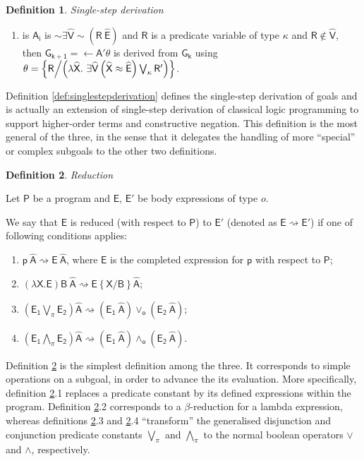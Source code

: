 \documentclass[inscr,ack,preface]{dithesis}
\theoremstyle{definition}
\newtheorem{definition}{Definition}[]
\newcommand{\msf}[1]{$\mathsf{#1}$}
\begin{document}
\begin{definition}{\emph{Single-step derivation}}
\begin{enumerate}
        where \msf{R'} is a fresh predicate variable of type \msf{\kappa};
  \item is \msf{A_i} is \msf{\sim \exists \widehat{V} \sim \left( R ~ \widehat{E} \right)}
        and \msf{R} is a predicate variable of type \msf{\kappa}
        and \msf{R \not\in \widehat{V}}, \\
        then \msf{G_{k+1} = \leftarrow A' \theta} is derived from \msf{G_k}
        using \msf{\theta = \left\{ R \middle/ \left( \lambda \widehat{X} . ~ \exists \widehat{V} \left( \widehat{X} \approx \widehat{E} \right) \bigvee_{\kappa} R' \right) \right\}}.
\end{enumerate}

Definition \ref{def:singlestepderivation} defines the single-step derivation of goals and is actually an extension of single-step derivation of classical logic programming to support higher-order terms and constructive negation. This definition is the most general of the three, in the sense that it delegates the handling of more ``special'' or complex subgoals to the other two definitions.
\end{definition}

\begin{definition}{\emph{Reduction}}
\label{def:reduction}

Let \msf{P} be a program and \msf{E}, \msf{E'} be body expressions of type $o$.

We say that \msf{E} is reduced (with respect to \msf{P}) to \msf{E'} (denoted as \msf{E \rightsquigarrow E'}) if one of following conditions applies:

\begin{enumerate}
  \item \msf{p ~ \widehat{A} \rightsquigarrow E ~ \widehat{A}}, where \msf{E} is the completed expression for \msf{p} with respect to \msf{P};
  \item \msf{\left( \lambda X. E \right) B ~ \widehat{A} \rightsquigarrow E\left\{ X / B \right\} \widehat{A}};
  \item \msf{\left( E_1 \bigvee_{\pi} E_2 \right) \widehat{A} \rightsquigarrow \left( E_1 ~ \widehat{A} \right) \lor_{o} \left( E_2 ~ \widehat{A}  \right)};
  \item \msf{\left( E_1 \bigwedge_{\pi} E_2 \right) \widehat{A} \rightsquigarrow \left( E_1 ~ \widehat{A} \right) \land_{o} \left( E_2 ~ \widehat{A}  \right)}.
\end{enumerate}

Definition \ref{def:reduction} is the simplest definition among the three. It corresponds to simple operations on a subgoal, in order to advance the its evaluation. More specifically, definition \ref{def:reduction}.1 replaces a predicate constant by its defined expressions within the program. Definition \ref{def:reduction}.2 corresponds to a $\beta$-reduction for a lambda expression, whereas definitions \ref{def:reduction}.3 and \ref{def:reduction}.4 ``transform'' the generalised disjunction and conjunction predicate constants $\bigvee_{\pi}$ and $\bigwedge_{\pi}$ to the normal boolean operators $\lor$ and $\land$, respectively.
\end{definition}
\end{document}
